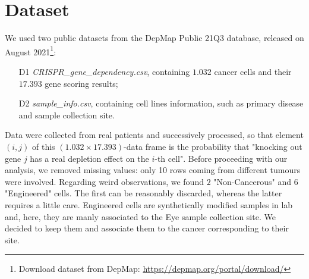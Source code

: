 \documentclass[a4paper,11pt, oneside]{article}  %
\begin{document}
	\section{Dataset}
	We used two public datasets from the DepMap Public 21Q3 database,  released on August 2021\footnote{Download dataset from DepMap:  \url{https://depmap.org/portal/download/}}:
	\begin{itemize}
		\item[D1] \textit{CRISPR\_gene\_dependency.csv},  containing $1.032$ cancer cells and their $17.393$ gene scoring results;
		\item[D2] \textit{sample\_info.csv}, containing cell lines information,  such as primary disease and sample collection site.
	\end{itemize}
	Data were collected from real patients and successively processed,  so that element $(i, j)$ of this $(1.032 \times 17.393)$-data frame is the probability that "knocking out gene $j$ has a real depletion effect on the $i$-th cell".
	Before proceeding with our analysis, we removed missing values: only 10 rows coming from different tumours were involved. Regarding weird observations, we found $2$ "Non-Cancerous" and $6$ "Engineered" cells. The first can be reasonably discarded, whereas the latter requires a little care. Engineered cells are synthetically modified samples in lab and, here, they are manly associated to the Eye sample collection site. We decided to keep them and associate them to the cancer corresponding to their site. 
	
\end{document}
